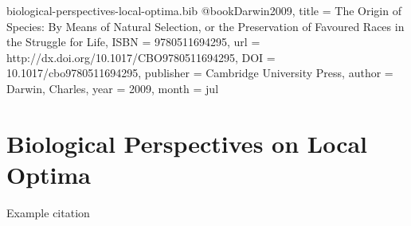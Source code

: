 \begin{bibunit}

\begin{filecontents*}[overwrite]{biological-perspectives-local-optima.bib}
@book{Darwin2009,
  title = {The Origin of Species: By Means of Natural Selection,  or the Preservation of Favoured Races in the Struggle for Life},
  ISBN = {9780511694295},
  url = {http://dx.doi.org/10.1017/CBO9780511694295},
  DOI = {10.1017/cbo9780511694295},
  publisher = {Cambridge University Press},
  author = {Darwin,  Charles},
  year = {2009},
  month = jul 
}
\end{filecontents*} 

\section{Biological Perspectives on Local Optima}
\label{sec:local-optima}

Example citation \citep{Darwin2009}

    
\end{bibunit}
